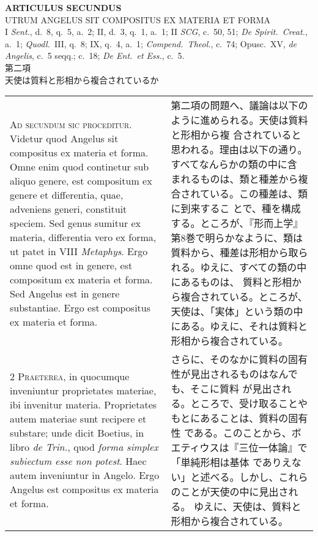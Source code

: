 \documentclass[10pt]{jsarticle} %
\begin{document}
\begin{center}
 {\Large {\bf ARTICULUS SECUNDUS}}\\
 {\large UTRUM ANGELUS SIT COMPOSITUS EX MATERIA ET FORMA}\\
 {\footnotesize I {\itshape Sent.}, d.~8, q.~5, a.~2; II, d.~3, q.~1,
 a.~1; II {\itshape SCG}, c.~50, 51; {\itshape De Spirit.~Creat.}, a.~1;
 {\itshape Quodl.}~III, q.~8; IX, q.~4, a.~1; {\itshape
 Compend.~Theol.}, c.~74; Opusc.~XV, {\itshape de Angelis}, c.~5 seqq.;
 c.~18; {\itshape De Ent.~et Ess.}, c.~5.}\\
 {\Large 第二項\\天使は質料と形相から複合されているか}
\end{center}

\begin{longtable}{p{21em}p{21em}}

 {\huge A}{\scshape d secundum sic proceditur}. Videtur quod Angelus
 sit compositus ex materia et forma. Omne enim quod continetur sub
 aliquo genere, est compositum ex genere et differentia, quae,
 adveniens generi, constituit speciem. Sed genus sumitur ex materia,
 differentia vero ex forma, ut patet in VIII {\itshape Metaphys}. Ergo
 omne quod est in genere, est compositum ex materia et forma. Sed
 Angelus est in genere substantiae. Ergo est compositus ex materia et
 forma.


&

 第二項の問題へ、議論は以下のように進められる。天使は質料と形相から複
 合されていると思われる。理由は以下の通り。すべてなんらかの類の中に含
 まれるものは、類と種差から複合されている。この種差は、類に到来するこ
 とで、種を構成する。ところが、『形而上学』第8巻で明らかなように、類は
 質料から、種差は形相から取られる。ゆえに、すべての類の中にあるものは、
 質料と形相から複合されている。ところが、天使は、「実体」という類の中
 にある。ゆえに、それは質料と形相から複合されている。

\\

 {\scshape 2 Praeterea}, in quocumque inveniuntur proprietates
 materiae, ibi invenitur materia. Proprietates autem materiae sunt
 recipere et substare; unde dicit Boetius, in libro {\itshape de
 Trin.}, quod {\itshape forma simplex subiectum esse non potest}. Haec
 autem inveniuntur in Angelo. Ergo Angelus est compositus ex materia
 et forma.

 &

 さらに、そのなかに質料の固有性が見出されるものはなんでも、そこに質料
 が見出される。ところで、受け取ることやもとにあることは、質料の固有性
 である。このことから、ボエティウスは『三位一体論』で「単純形相は基体
 でありえない」と述べる。しかし、これらのことが天使の中に見出される。
 ゆえに、天使は、質料と形相から複合されている。


\end{longtable}
\end{document}
